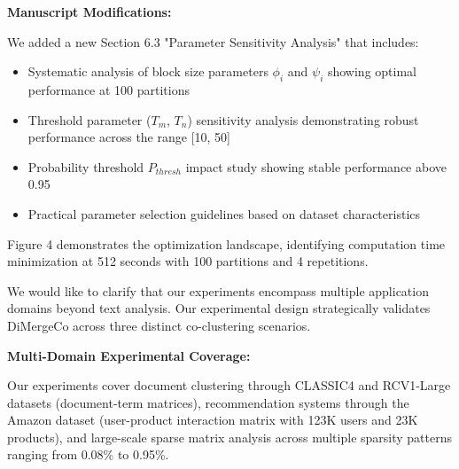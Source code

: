 \documentclass{ar2rc}
\begin{document}


\textbf{Manuscript Modifications:}

We added a new Section 6.3 "Parameter Sensitivity Analysis" that includes:

\begin{itemize}
  \item Systematic analysis of block size parameters $\phi_i$ and $\psi_i$ showing optimal performance at 100 partitions
  \item Threshold parameter ($T_m$, $T_n$) sensitivity analysis demonstrating robust performance across the range [10, 50]
  \item Probability threshold $P_{thresh}$ impact study showing stable performance above 0.95
  \item Practical parameter selection guidelines based on dataset characteristics
\end{itemize}

Figure 4 demonstrates the optimization landscape, identifying computation time minimization at 512 seconds with 100 partitions and 4 repetitions.


\AR We would like to clarify that our experiments encompass multiple application domains beyond text analysis. Our experimental design strategically validates DiMergeCo across three distinct co-clustering scenarios.

\textbf{Multi-Domain Experimental Coverage:}

Our experiments cover document clustering through CLASSIC4 and RCV1-Large datasets (document-term matrices), recommendation systems through the Amazon dataset (user-product interaction matrix with 123K users and 23K products), and large-scale sparse matrix analysis across multiple sparsity patterns ranging from 0.08\% to 0.95\%.
\end{document}

